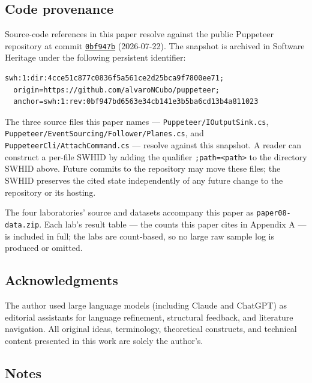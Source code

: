 \documentclass[
]{article}
\begin{document}
\subsection{Code provenance}\label{code-provenance}

Source-code references in this paper resolve against the public
Puppeteer repository at commit
\href{https://github.com/alvaroNCubo/puppeteer/tree/0bf947bd6563e34cb141e3b5ba6cd13b4a811023}{\texttt{0bf947b}}
(2026-07-22). The snapshot is archived in Software Heritage under the
following persistent identifier:

\begin{verbatim}
swh:1:dir:4cce51c877c0836f5a561ce2d25bca9f7800ee71;
  origin=https://github.com/alvaroNCubo/puppeteer;
  anchor=swh:1:rev:0bf947bd6563e34cb141e3b5ba6cd13b4a811023
\end{verbatim}

The three source files this paper names ---
\texttt{Puppeteer/IOutputSink.cs},
\texttt{Puppeteer/EventSourcing/Follower/Planes.cs}, and
\texttt{PuppeteerCli/AttachCommand.cs} --- resolve against this
snapshot. A reader can construct a per-file SWHID by adding the
qualifier \texttt{;path=\textless{}path\textgreater{}} to the directory
SWHID above. Future commits to the repository may move these files; the
SWHID preserves the cited state independently of any future change to
the repository or its hosting.

The four laboratories' source and datasets accompany this paper as
\texttt{paper08-data.zip}. Each lab's result table --- the counts this
paper cites in Appendix A --- is included in full; the labs are
count-based, so no large raw sample log is produced or omitted.

\subsection{Acknowledgments}\label{acknowledgments}

The author used large language models (including Claude and ChatGPT) as
editorial assistants for language refinement, structural feedback, and
literature navigation. All original ideas, terminology, theoretical
constructs, and technical content presented in this work are solely the
author's.

\subsection{Notes}\label{notes}
\end{document}
